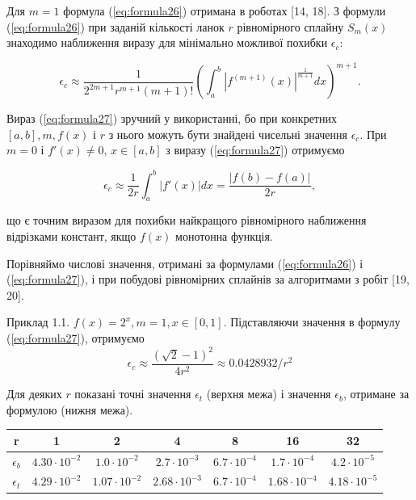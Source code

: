 \documentclass[ukrainian,14pt]{extarticle}
\begin{document}
Для $m = 1$ формула (\ref{eq:formula26}) отримана в роботах [14, 18]. З формули (\ref{eq:formula26}) при заданій кількості ланок $r$ рівномірного сплайну $S_m(x)$ знаходимо наближення виразу для мінімально можливої похибки $\epsilon_c$: 

\begin{equation}\label{eq:formula27}
  \epsilon_c \approx \frac{1}{2^{2m+1} r^{m+1} (m+1)!} \left( \int_a^b \left|f^{(m+1)}(x)\right|^{\frac{1}{m+1} }dx \right)^{m+1}.
\end{equation}

Вираз (\ref{eq:formula27}) зручний у використанні, бо при конкретних $[a, b], m, f(x)$ і $r$ з нього можуть бути знайдені чисельні значення $\epsilon_c$. При $m = 0$ і $f'(x) \neq 0$, $x \in [a, b]$ з виразу (\ref{eq:formula27}) отримуємо

\begin{equation}\label{eq:formula28}
    \epsilon_c \approx \frac{1}{2r} \int_a^b |f'(x)|dx = \frac{|f(b) - f(a)|}{2r},
\end{equation}

що є точним виразом для похибки найкращого рівномірного наближення відрізками констант, якщо $f(x)$ монотонна функція.

Порівняймо числові значення, отримані за формулами (\ref{eq:formula26}) і (\ref{eq:formula27}), і при побудові рівномірних сплайнів за алгоритмами з робіт [19, 20].

\vspace{1cm}

Приклад 1.1. $f(x) = 2^x, m = 1, x \in [0, 1]$. Підставляючи значення в формулу (\ref{eq:formula27}), отримуємо
$$\epsilon_c \approx \frac{(\sqrt{2} - 1)^2}{4r^2} \approx 0.0428932 / r^2$$

Для деяких $r$ показані точні значення $\epsilon_t$ (верхня межа) і значення $\epsilon_b$, отримане за формулою (нижня межа).

\bgroup
\def\arraystretch{1.5}%
\begin{center}
\begin{tabular}{ c | c |
c | c | c | c | c }
 r & 1 & 2 & 4 & 8 & 16 & 32 \\
 \hline
 $\epsilon_b$ & $4.30 \cdot 10^{-2}$ & $1.0 \cdot 10^{-2}$ & $2.7 \cdot 10^{-3}$ & $6.7 \cdot 10^{-4}$ & $1.7 \cdot 10^{-4}$ & $4.2 \cdot 10^{-5}$ \\  
 \hline
 $\epsilon_t$ & $4.29 \cdot 10^{-2}$ & $1.07 \cdot 10^{-2}$ & $2.68 \cdot 10^{-3}$ & $6.7 \cdot 10^{-4}$ & $1.68 \cdot 10^{-4}$ & $4.18 \cdot 10^{-5}$    
\end{tabular}
\end{center}
\egroup
\end{document}
